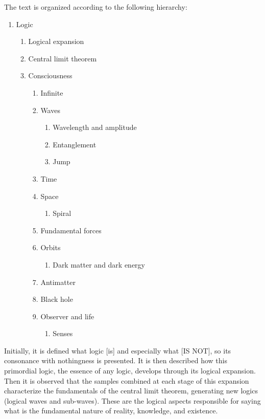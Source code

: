 \noindent The text is organized according to the following hierarchy:
	\begin{enumerate}[label*=\arabic*.]
	   \item Logic
	   \begin{enumerate}[label*=\arabic*.]
		   \item Logical expansion
		   \item Central limit theorem
		   \item Consciousness
			   \begin{enumerate}[label*=\arabic*.]
				   \item Infinite
				   \item Waves 
				   \begin{enumerate}[label*=\arabic*.]
				   		\item Wavelength and amplitude
				   		\item Entanglement
				   		\item Jump
				   \end{enumerate}  
				   \item Time
				   \item Space
				   \begin{enumerate}[label*=\arabic*.]
				   		\item Spiral
				   \end{enumerate} 
				   \item Fundamental forces
				   \item Orbits
				   \begin{enumerate}[label*=\arabic*.]
				   		\item Dark matter and dark energy
				   \end{enumerate} 
				   \item Antimatter
				   \item Black hole
				   \item Observer and life
				   \begin{enumerate}[label*=\arabic*.]
				   		\item Senses
				   \end{enumerate}  
			   \end{enumerate}   
	   \end{enumerate}
	\end{enumerate}

Initially, it is defined what logic [is] and especially what [IS NOT], so its consonance with nothingness is presented. It is then described how this primordial logic, the essence of any logic, develops through its logical expansion. Then it is observed that the samples combined at each stage of this expansion characterize the fundamentals of the central limit theorem, generating new logics (logical waves and sub-waves). These are the logical aspects responsible for saying what is the fundamental nature of reality, knowledge, and existence. 

\bigbreak